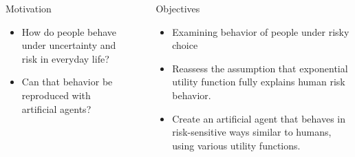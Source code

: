 \documentclass[final]{beamer}
\newlength{\sepwid}
\newlength{\onecolwid}
\newlength{\twocolwid}
\begin{document}
\begin{frame}
\begin{columns}[t]
\begin{column}{\onecolwid}
\begin{exampleblock}{Motivation}

\begin{itemize}
\item How do people behave under uncertainty and risk in everyday life?
\item Can that behavior be reproduced with artificial agents?
\end{itemize}

\end{exampleblock}






\end{column} %

\begin{column}{\sepwid}\end{column} %

\begin{column}{\twocolwid} %

\begin{columns}[t,totalwidth=\twocolwid] %

\begin{column}{\onecolwid}\vspace{-.74in} %


\begin{exampleblock}{Objectives}

\begin{itemize}
\item Examining behavior of people under risky choice
\item Reassess the assumption that exponential utility function fully explains human risk behavior.
\item Create an artificial agent that behaves in risk-sensitive ways similar to humans, using various utility functions.
\end{itemize}


\end{exampleblock}
\end{column}
\end{columns}
\end{column}
\end{columns}
\end{frame}
\end{document}
